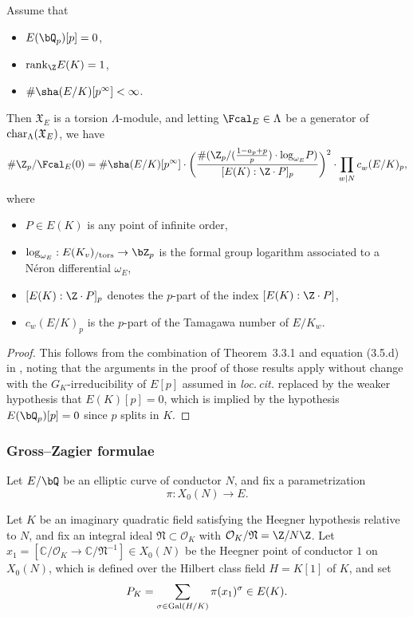 \begin{theorem}
\notready\label{controlthm}
Assume that
\begin{itemize}
\item $E(\bQ_p)[p]=0$,
\item{} ${\rm rank}_{\Z}E(K)=1$,
\item{} $\#\sha(E/K)[p^\infty]<\infty$.
\end{itemize}
Then $\mathfrak{X}_E$ is a torsion $\Lambda$-module, and letting $\Fcal_E\in\Lambda$ be a generator of ${\rm char}_\Lambda(\mathfrak{X}_E)$, we have
\[
\# \Z_p /\Fcal_E(0) =
\# \sha(E/K)[p^\infty]\cdot\biggl(  \frac{ \# (\Z_p / ( \frac{1-a_p+p}{p}) \cdot \mathrm{log}_{\omega_E} P) }{ [E(K): \Z\cdot P]_p }\biggr)^2\cdot\prod_{w\mid N} c_w^{}(E/K)_p,
\]
where
\begin{itemize}
\item $P\in E(K)$ is any point of infinite order,
\item $\log_{\omega_E}:E(K_v)_{/{\rm tors}}\rightarrow\bZ_p$ is the formal group logarithm associated to a N\'{e}ron differential $\omega_E$,
\item $[E(K):\Z\cdot P]_p$ denotes the $p$-part of the index $[E(K):\Z\cdot P]$,
\item $c_w^{}(E/K)_p$ is the $p$-part of the Tamagawa number of $E/K_w$.
\end{itemize}
\end{theorem}

\begin{proof}
This follows from the combination of Theorem~3.3.1 and equation (3.5.d) in \cite[(3.5.d)]{jsw}, noting that the arguments in the proof of those results apply without change with the $G_K$-irreducibility of $E[p]$ assumed in \emph{loc.\,cit.} replaced by the weaker hypothesis that $E(K)[p]=0$, {which
is implied by the hypothesis $E(\bQ_p)[p]=0$ since $p$ splits in $K$}.
\end{proof}


\subsubsection{Gross--Zagier formulae}

Let $E/\bQ$ be an elliptic curve of conductor $N$, and fix a  parametrization
\[
\pi:X_0(N)\rightarrow E.
\]

Let $K$ be an imaginary quadratic field
satisfying the Heegner hypothesis relative to $N$, and fix an integral ideal $\mathfrak{N}\subset\mathcal{O}_K$ with $\mathcal{O}_K/\mathfrak{N}=\Z/N\Z$. Let $x_1=[\mathbb{C}/\mathcal{O}_K\rightarrow\mathbb{C}/\mathfrak{N}^{-1}]\in X_0(N)$
be the Heegner point of conductor $1$ on $X_0(N)$, which is defined over the Hilbert class field $H=K[1]$ of $K$, and set
\[
P_K=\sum_{\sigma\in{\rm Gal}(H/K)}\pi(x_1)^\sigma\in E(K).
\]

